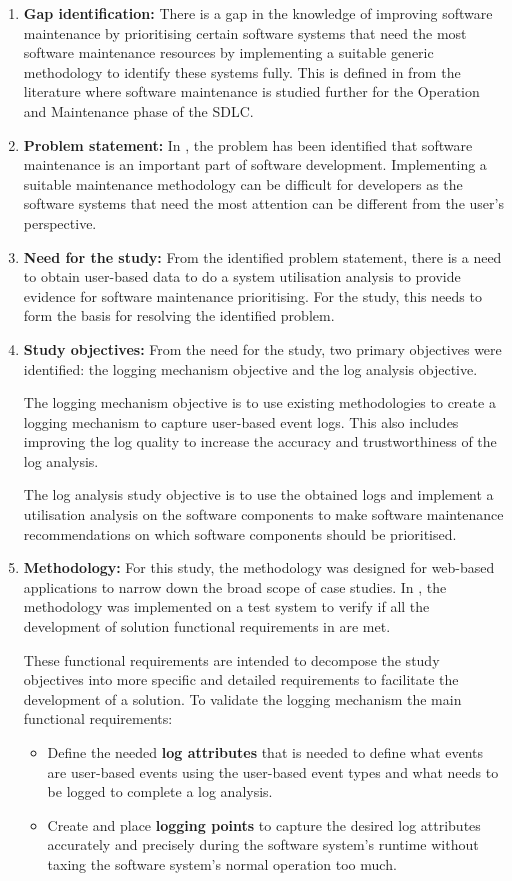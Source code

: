 \begin{enumerate}[label=\textbf{\Roman*.}]	
	\item \textbf{Gap identification:} There is a gap in the knowledge of improving software maintenance by prioritising certain software systems that need the most software maintenance resources by implementing a suitable generic methodology to identify these systems fully. This is defined in  from the literature where software maintenance is studied further for the Operation and Maintenance phase of the SDLC.
	\item \textbf{Problem statement:} In , the problem has been identified that software maintenance is an important part of software development. Implementing a suitable maintenance methodology can be difficult for developers as the software systems that need the most attention can be different from the user's perspective.  
	\item \textbf{Need for the study:} From the identified problem statement, there is a need to obtain user-based data to do a system utilisation analysis to provide evidence for software maintenance prioritising. For the study, this needs to form the basis for resolving the identified problem.
	\item \textbf{Study objectives:} From the need for the study, two primary objectives were identified: the logging mechanism objective and the log analysis objective.\par The logging mechanism objective is to use existing methodologies to create a logging mechanism to capture user-based event logs. This also includes improving the log quality to increase the accuracy and trustworthiness of the log analysis.\par The log analysis study objective is to use the obtained logs and implement a utilisation analysis on the software components to make software maintenance recommendations on which software components should be prioritised.
	\item \textbf{Methodology:} For this study, the methodology was designed for web-based applications to narrow down the broad scope of case studies. In , the methodology was implemented on a test system to verify if all the development of solution functional requirements in  are met.\par These functional requirements are intended to decompose the study objectives into more specific and detailed requirements to facilitate the development of a solution. To validate the logging mechanism the main functional requirements:
	 \begin{itemize}
		\item Define the needed \textbf{log attributes} that is needed to define what events are user-based events using the user-based event types and what needs to be logged to complete a log analysis.
		\item Create and place \textbf{logging points} to capture the desired log attributes accurately and precisely during the software system's runtime without taxing the software system's normal operation too much.
	 \end{itemize}


\end{enumerate}

